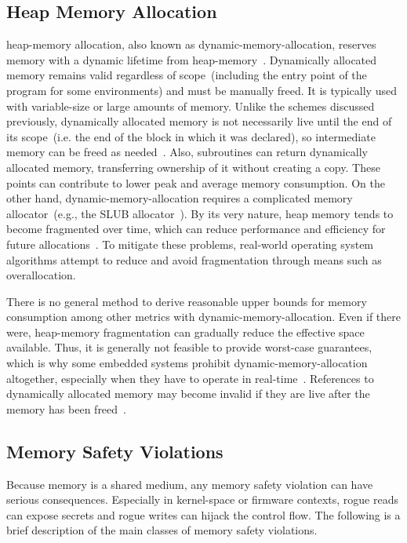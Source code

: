 \subsection{Heap Memory Allocation}
\label{sec:heap_mem_alloc}

\Gls{heap-memory} allocation, also known as \gls{dynamic-memory-allocation}, reserves memory with a dynamic lifetime from \gls{heap-memory}~\cite{os-concepts,ISO:2018:III,rust-ref}. Dynamically allocated memory remains valid regardless of scope~(including the entry point of the program for some environments) and must be manually freed. It is typically used with variable-size or large amounts of memory. Unlike the schemes discussed previously, dynamically allocated memory is not necessarily live until the end of its scope~(i.e. the end of the block in which it was declared), so intermediate memory can be freed as needed~\cite{ISO:2018:III}. Also, subroutines can return dynamically allocated memory, transferring ownership of it without creating a copy. These points can contribute to lower peak and average memory consumption. On the other hand, \gls{dynamic-memory-allocation} requires a complicated memory allocator~(e.g., the SLUB allocator~\cite{slub-alloc}). By its very nature, heap memory tends to become fragmented over time, which can reduce performance and efficiency for future allocations~\cite{slub-alloc}. To mitigate these problems, real-world operating system algorithms attempt to reduce and avoid fragmentation through means such as overallocation.

There is no general method to derive reasonable upper bounds for memory consumption among other metrics with \gls{dynamic-memory-allocation}. Even if there were, \gls{heap-memory} fragmentation can gradually reduce the effective space available. Thus, it is generally not feasible to provide worst-case guarantees, which is why some embedded systems prohibit \gls{dynamic-memory-allocation} altogether, especially when they have to operate in real-time~\cite{rt-dynmem}. References to dynamically allocated memory may become invalid if they are live after the memory has been freed~\cite{ISO:2018:III}.

\subsection{Memory Safety Violations}
\label{sec:mem_violations}

Because memory is a shared medium, any memory safety violation can have serious consequences. Especially in \gls{kernel-space} or \gls{firmware} contexts, rogue reads can expose secrets and rogue writes can hijack the control flow. The following is a brief description of the main classes of memory safety violations.

